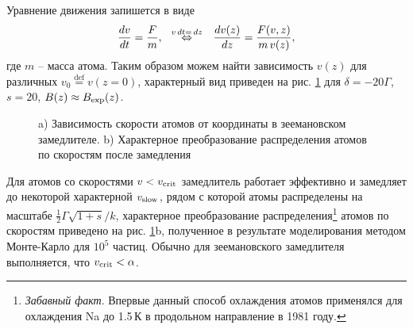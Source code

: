 Уравнение движения запишется в виде
\begin{equation}
    \frac{d v}{d t} = \frac{F}{m},
    \hspace{0.25cm} \overset{v \, d t = \, d z}{\Leftrightarrow}  \hspace{0.25cm}
    \frac{d v(z)}{d z} = \frac{F(v, z)}{m \, v(z)},
\end{equation}
где $m$ -- масса атома. Таким образом можем найти зависимость $v(z)$ для различных $v_0 \overset{\mathrm{def}}{=} v(z=0)$, характерный вид приведен на рис. \ref{fig:vZz} для $\delta = -20\Gamma$, $s=20$, $B(z) \approx B_{\textnormal{exp}}(z)$.
\begin{figure}[ht]
    \centering
    \hspace{10 mm} 
    \vspace{-3mm}
    \caption{a) Зависимость скорости атомов от координаты в зеемановском замедлителе. b) Характерное преобразование распределения атомов по скоростям после замедления}
    \label{fig:vZz}
\end{figure}


Для атомов со скоростями $v < v_{\textnormal{crit}}$ замедлитель работает эффективно и замедляет до некоторой характерной $v_{\textnormal{slow}}$, рядом с которой атомы распределены на масштабе  $\frac{1}{2}\Gamma\sqrt{1+s} / k$, характерное преобразование распределения\footnote{
    \textit{Забавный факт}. Впервые данный способ охлаждения атомов применялся \cite{__1981} для охлаждения Na до 1.5\,К в продольном направление  в 1981 году.
}  атомов по скоростям приведено на рис. \ref{fig:vZz}b, полученное в результате моделирования методом Монте-Карло для $10^5$ частиц. Обычно для зеемановского замедлителя выполняется, что $v_{\textnormal{crit}} < \alpha$. 


